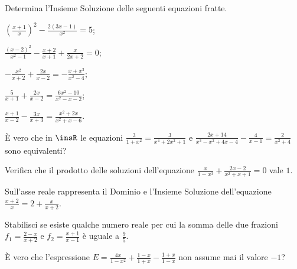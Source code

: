 \begin{esercizio}[\Ast]
 \label{ese:3.48}
Determina l'Insieme Soluzione delle seguenti equazioni fratte.
\begin{multicols}{2}
\begin{enumeratea}
\item $\left(\frac{x + 1}{x} \right)^{2}-\frac{2 (3 x-1)}{x^{2}} = 5$;
\item $\frac{(x-2)^{2}}{x^{2}-1}-\frac{x + 2}{x + 1} +\frac{x}{2 x + 2} = 0$;
\item $- \frac{x^{2}}{x + 2} + \frac{2 x}{x-2} =-\frac{x + x^{3}}{x^{2}-4}$;
\item $\frac{5}{x + 1} + \frac{2 x}{x-2} = \frac{6 x^{2}-10}{x^{2}-x-2}$;
\item $\frac{x + 1}{x-2}-\frac{3 x}{x + 3} = \frac{x^{2} + 2 x}{x^{2} + x-6}$.
\end{enumeratea}
\end{multicols}
\end{esercizio}

\begin{esercizio}[\Ast]
 \label{ese:3.49}
È vero che in $\insR$ le equazioni $\frac{3}{1 + x^{2}} = \frac{3}{x^{4} + 2 x^{2} + 1}$ e $\frac{2 x + 14}{x^{3}-x^{2} + 4 x-4}-\frac{4}{x-1} =\frac{2}{x^{2} + 4}$ sono equivalenti?
\end{esercizio}

\begin{esercizio}[\Ast]
 \label{ese:3.50}
Verifica che il prodotto delle soluzioni dell'equazione $\frac{x}{1-x^{3}} + \frac{2 x-2}{x^{2} + x + 1}=0$ vale $1$.
\end{esercizio}

\begin{esercizio}[\Ast]
 \label{ese:3.51}
Sull'asse reale rappresenta il Dominio e l'Insieme Soluzione dell'equazione $\frac{x + 2}{x}=2+\frac{x}{x + 2}$.
\end{esercizio}

\begin{esercizio}[\Ast]
 \label{ese:3.52}
Stabilisci se esiste qualche numero reale per cui la somma delle due frazioni $f_{1}=\frac{2-x}{x + 2}$ e $f_{2}=\frac{x + 1}{x-1}$ è uguale a $\frac{9}{5}$.
\end{esercizio}

\begin{esercizio}[\Ast]
 \label{ese:3.53}
È vero che l'espressione $E=\frac{4 x}{1-x^{2}} + \frac{1-x}{1 + x}-\frac{1 + x}{1-x}$ non assume mai il valore $-1$?
\end{esercizio}

